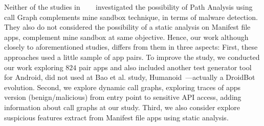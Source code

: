 Neither of the studies in ~\cite{DBLP:conf/icse/JamrozikSZ16}~\cite{DBLP:conf/wcre/BaoLL18}~\cite{le2018towards} investigated the possibility of Path Analysis using call Graph complements mine sandbox technique, in terms of malware detection. They also do not considered the possibility of a static analysis on Manifest file apps, complement mine sandbox at same objective. Hence, our work although closely to aforementioned studies, differs from them in three aspects: First, these approaches used a little sample of app pairs. To improve the study, we conducted our work exploring $824$ pair apps and also included another test generator tool for Android, did not used at Bao et al. study, Humanoid~\cite{DBLP:conf/kbse/LiY0C19}---actually a DroidBot evolution. Second, we explore dynamic call graphs, exploring traces of apps version (benign/malicious) from entry point to sensitive API access, adding information about call graphs at our study. Third, we also consider explore suspicious features extract from Manifest file apps using static analysis.